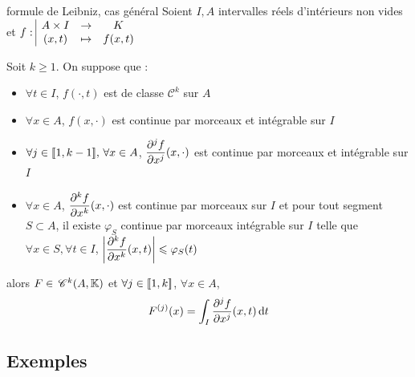 \begin{theoreme}{formule de Leibniz, cas général}{}
    Soient $I, A$ intervalles réels d'intérieurs non vides et $f: \space \begin{array}{|ccc} \displaystyle A \times I & \to & \displaystyle K \\ \displaystyle (x, t) & \mapsto & \displaystyle f(x, t) \end{array}$ 

    Soit $k \geqslant 1$. On suppose que : 
    \begin{itemize}
        \item $\forall t \in I$, $f(\cdot, t)$ est de classe $\mathscr C^k$ sur $A$
        \item $\forall x \in A$, $f(x, \cdot)$ est continue par morceaux et intégrable sur $I$
        \item $\forall j \in [\![1, k - 1]\!], \, \forall x \in A$, $\displaystyle \frac{\partial^j f}{\partial x^j}(x, \cdot)$ est continue 
        par morceaux et intégrable sur $I$
        \item $\forall x \in A$, $\displaystyle \frac{\partial^k f }{\partial x^k}(x, \cdot)$ est continue par morceaux 
        sur $I$ et pour tout segment $S \subset A$, il existe $\varphi_S$ continue par morceaux intégrable sur 
        $I$ telle que $\forall x \in S, \forall t \in I$, $\displaystyle \left| \frac{\partial^k f }{\partial x^k}(x, t) \right| \leqslant \varphi_S(t)$
    \end{itemize}

    \svspace alors $F \in \,\mathscr C^{k} (A, \mathbb{K})$ et $\forall j \in [\![1, k]\!]$, $\forall x \in A$, 
    $$F^{(j)}(x) = \int_I \frac{\partial^j f}{\partial x^j}(x, t) \,\mathrm{d}t$$
\end{theoreme}

\subsection{Exemples }

